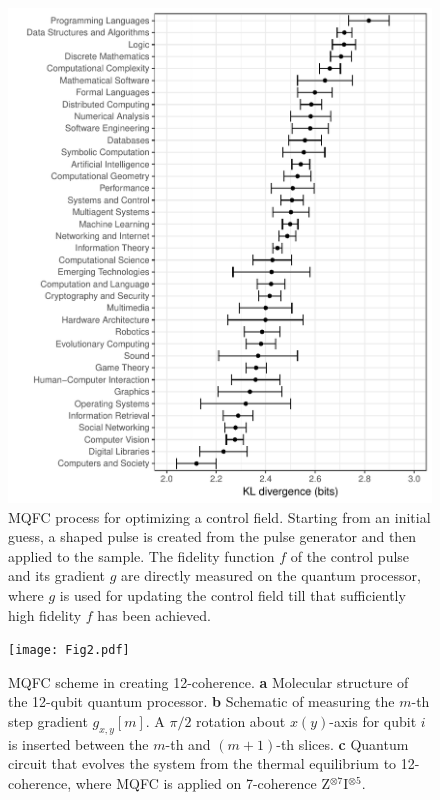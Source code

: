 \documentclass[twocolumn,reprint, amsmath,amssymb,showpacs,superscriptaddress]{revtex4-1}
\begin{document}
\newpage

\begin{figure}
\center
\includegraphics[width=1.8\columnwidth]{Fig1.pdf}
\caption{MQFC process for optimizing a control field. Starting from an initial guess, a shaped pulse is created from the pulse generator and then applied to the sample. The fidelity function $f$ of the control pulse and its gradient $g$ are directly measured on the quantum processor, where $g$ is used for   updating the control field till that sufficiently high fidelity $f$ has been   achieved.}
\label{fig1}
\end{figure}

\newpage
\begin{figure}
\texttt{[image: Fig2.pdf]}
\caption{MQFC scheme in creating 12-coherence. \textbf{a} Molecular structure of the 12-qubit quantum processor. \textbf{b} Schematic of measuring the $m$-th step gradient $g_{x,y}[m]$. A $\pi/2$ rotation about $x (y)$-axis for qubit $i$ is inserted between the $m$-th and $(m+1)$-th slices. \textbf{c} Quantum circuit that evolves the system from the thermal equilibrium to 12-coherence, where MQFC is applied on 7-coherence Z$^{\otimes 7}$I$^{\otimes 5}$. }
\label{fig2}
\end{figure}
\end{document}
